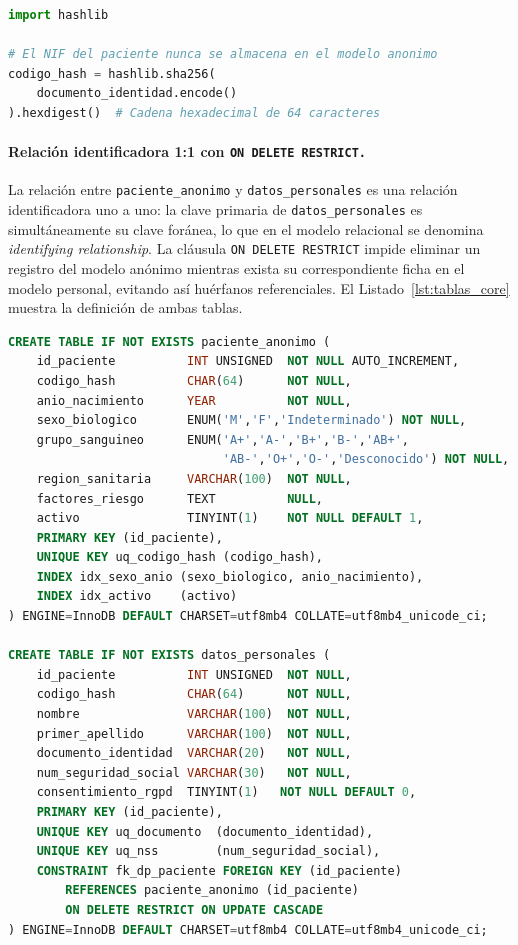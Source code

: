 \documentclass[../main.tex]{subfiles}
\begin{document}
\begin{lstlisting}[language=Python, caption={Generación del identificador anónimo mediante SHA-256 del documento de identidad.}, label={lst:sha256}]
import hashlib

# El NIF del paciente nunca se almacena en el modelo anonimo
codigo_hash = hashlib.sha256(
    documento_identidad.encode()
).hexdigest()  # Cadena hexadecimal de 64 caracteres
\end{lstlisting}

\paragraph{Relación identificadora 1:1 con \texttt{ON DELETE RESTRICT.}}

La relación entre \texttt{paciente\_anonimo} y \texttt{datos\_personales} es una relación identificadora uno a uno: la clave primaria de \texttt{datos\_personales} es simultáneamente su clave foránea, lo que en el modelo relacional se denomina \textit{identifying relationship}. La cláusula \texttt{ON DELETE RESTRICT} impide eliminar un registro del modelo anónimo mientras exista su correspondiente ficha en el modelo personal, evitando así huérfanos referenciales. El Listado~\ref{lst:tablas_core} muestra la definición de ambas tablas.

\begin{lstlisting}[language=SQL, caption={Tablas \texttt{paciente\_anonimo} y \texttt{datos\_personales}: relación identificadora 1:1 con integridad referencial.}, label={lst:tablas_core}]
CREATE TABLE IF NOT EXISTS paciente_anonimo (
    id_paciente          INT UNSIGNED  NOT NULL AUTO_INCREMENT,
    codigo_hash          CHAR(64)      NOT NULL,
    anio_nacimiento      YEAR          NOT NULL,
    sexo_biologico       ENUM('M','F','Indeterminado') NOT NULL,
    grupo_sanguineo      ENUM('A+','A-','B+','B-','AB+',
                              'AB-','O+','O-','Desconocido') NOT NULL,
    region_sanitaria     VARCHAR(100)  NOT NULL,
    factores_riesgo      TEXT          NULL,
    activo               TINYINT(1)    NOT NULL DEFAULT 1,
    PRIMARY KEY (id_paciente),
    UNIQUE KEY uq_codigo_hash (codigo_hash),
    INDEX idx_sexo_anio (sexo_biologico, anio_nacimiento),
    INDEX idx_activo    (activo)
) ENGINE=InnoDB DEFAULT CHARSET=utf8mb4 COLLATE=utf8mb4_unicode_ci;

CREATE TABLE IF NOT EXISTS datos_personales (
    id_paciente          INT UNSIGNED  NOT NULL,
    codigo_hash          CHAR(64)      NOT NULL,
    nombre               VARCHAR(100)  NOT NULL,
    primer_apellido      VARCHAR(100)  NOT NULL,
    documento_identidad  VARCHAR(20)   NOT NULL,
    num_seguridad_social VARCHAR(30)   NOT NULL,
    consentimiento_rgpd  TINYINT(1)   NOT NULL DEFAULT 0,
    PRIMARY KEY (id_paciente),
    UNIQUE KEY uq_documento  (documento_identidad),
    UNIQUE KEY uq_nss        (num_seguridad_social),
    CONSTRAINT fk_dp_paciente FOREIGN KEY (id_paciente)
        REFERENCES paciente_anonimo (id_paciente)
        ON DELETE RESTRICT ON UPDATE CASCADE
) ENGINE=InnoDB DEFAULT CHARSET=utf8mb4 COLLATE=utf8mb4_unicode_ci;
\end{lstlisting}
\end{document}
